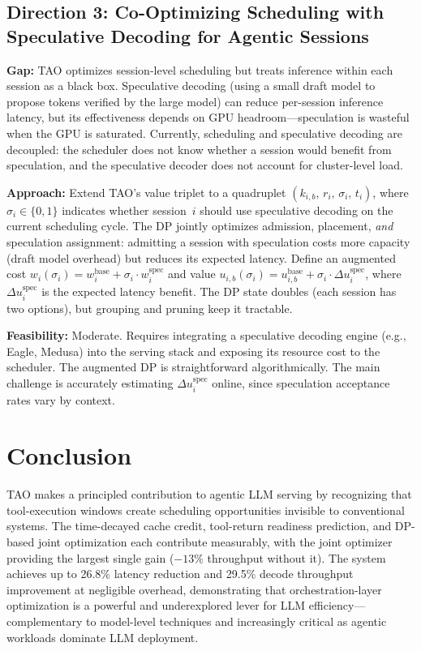 \documentclass[11pt,a4paper]{article}
\begin{document}
\subsection{Direction 3: Co-Optimizing Scheduling with Speculative Decoding for Agentic Sessions}
\textbf{Gap:} TAO optimizes session-level scheduling but treats inference within each session as a black box. Speculative decoding (using a small draft model to propose tokens verified by the large model) can reduce per-session inference latency, but its effectiveness depends on GPU headroom---speculation is wasteful when the GPU is saturated. Currently, scheduling and speculative decoding are decoupled: the scheduler does not know whether a session would benefit from speculation, and the speculative decoder does not account for cluster-level load.

\textbf{Approach:} Extend TAO's value triplet to a quadruplet $(k_{i,b},\, r_i,\, \sigma_i,\, t_i)$, where $\sigma_i \in \{0, 1\}$ indicates whether session~$i$ should use speculative decoding on the current scheduling cycle. The DP jointly optimizes admission, placement, \emph{and} speculation assignment: admitting a session with speculation costs more capacity (draft model overhead) but reduces its expected latency. Define an augmented cost $w_i(\sigma_i) = w_i^{\text{base}} + \sigma_i \cdot w_i^{\text{spec}}$ and value $u_{i,b}(\sigma_i) = u_{i,b}^{\text{base}} + \sigma_i \cdot \Delta u_i^{\text{spec}}$, where $\Delta u_i^{\text{spec}}$ is the expected latency benefit. The DP state doubles (each session has two options), but grouping and pruning keep it tractable.

\textbf{Feasibility:} Moderate. Requires integrating a speculative decoding engine (e.g., Eagle, Medusa) into the serving stack and exposing its resource cost to the scheduler. The augmented DP is straightforward algorithmically. The main challenge is accurately estimating $\Delta u_i^{\text{spec}}$ online, since speculation acceptance rates vary by context.

\section{Conclusion}
TAO makes a principled contribution to agentic LLM serving by recognizing that tool-execution windows create scheduling opportunities invisible to conventional systems. The time-decayed cache credit, tool-return readiness prediction, and DP-based joint optimization each contribute measurably, with the joint optimizer providing the largest single gain ($-13\%$ throughput without it). The system achieves up to 26.8\% latency reduction and 29.5\% decode throughput improvement at negligible overhead, demonstrating that orchestration-layer optimization is a powerful and underexplored lever for LLM efficiency---complementary to model-level techniques and increasingly critical as agentic workloads dominate LLM deployment.
\end{document}

